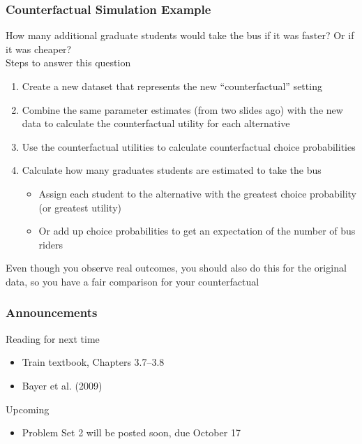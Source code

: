 \documentclass{beamer}
\begin{document}
\begin{frame}\frametitle{Counterfactual Simulation Example}
    How many additional graduate students would take the bus if it was faster? Or if it was cheaper? \\
    \vspace{1ex}
    Steps to answer this question
    \begin{enumerate}
        \item Create a new dataset that represents the new ``counterfactual'' setting
        \item Combine the same parameter estimates (from two slides ago) with the new data to calculate the counterfactual utility for each alternative
        \item Use the counterfactual utilities to calculate counterfactual choice probabilities
        \item Calculate how many graduates students are estimated to take the bus
        \begin{itemize}
            \item Assign each student to the alternative with the greatest choice probability (or greatest utility)
            \item Or add up choice probabilities to get an expectation of the number of bus riders
        \end{itemize}
    \end{enumerate}
    \vspace{1ex}
    Even though you observe real outcomes, you should also do this for the original data, so you have a fair comparison for your counterfactual
\end{frame}

\begin{frame}\frametitle{Announcements}
    Reading for next time
    \begin{itemize}
        \item Train textbook, Chapters 3.7--3.8
        \item Bayer et al. (2009)
    \end{itemize}
    \vspace{3ex}
    Upcoming
    \begin{itemize}
        \item Problem Set 2 will be posted soon, due October 17
    \end{itemize}
\end{frame}
\end{document}
